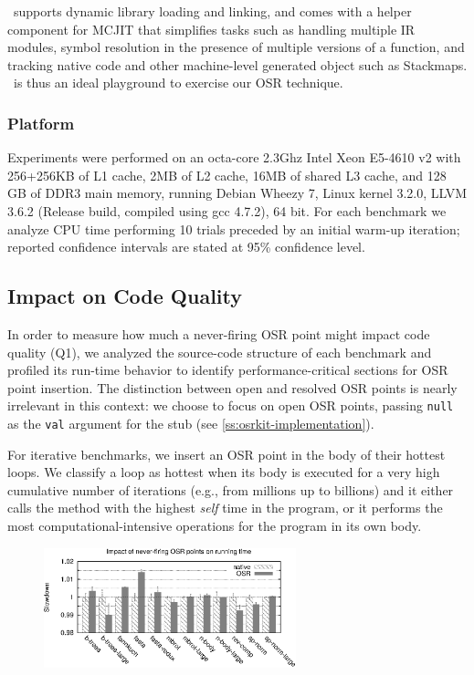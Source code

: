 \tinyvm\ supports dynamic library loading and linking, and comes with a helper component for MCJIT that simplifies tasks such as handling multiple IR modules, symbol resolution in the presence of multiple versions of a function, and tracking native code and other machine-level generated object such as Stackmaps. \tinyvm\ is thus an ideal playground to exercise our OSR technique.

\subsubsection*{Platform}
Experiments were performed on an octa-core 2.3Ghz Intel Xeon E5-4610 v2 with 256+256KB of L1 cache, 2MB of L2 cache, 16MB of shared L3 cache, and 128 GB of DDR3 main memory, running Debian Wheezy 7, Linux kernel 3.2.0, LLVM 3.6.2 (Release build, compiled using gcc 4.7.2), 64 bit. For each benchmark we analyze CPU time performing 10 trials preceded by an initial warm-up iteration; reported confidence intervals are stated at 95\% confidence level.

\subsection{Impact on Code Quality}

In order to measure how much a never-firing OSR point might impact code quality (Q1), we analyzed the source-code structure of each benchmark and profiled its run-time behavior to identify performance-critical sections for OSR point insertion. The distinction between open and resolved OSR points is nearly irrelevant in this context: we choose to focus on open OSR points, passing {\tt null} as the {\tt val} argument for the stub (see \mysection\ref{ss:osrkit-implementation}).

For iterative benchmarks, we insert an OSR point in the body of their hottest loops. We classify a loop as hottest when its body is executed for a very high cumulative number of iterations (e.g., from millions up to billions) and it either calls the method with the highest {\em self} time in the program, or it performs the most computational-intensive operations for the program in its own body.

\ifdefined\noauthorea
\begin{figure}[t]
\begin{center}
\includegraphics[width=0.65\textwidth]{figures/osr-code-quality-base/osr-code-quality-base.eps}
\caption{\protect}
\end{center}
\end{figure}
\fi

